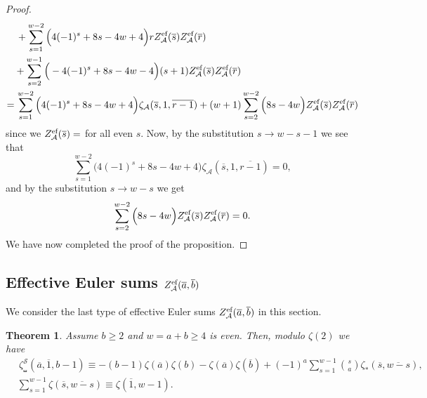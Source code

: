 \documentclass{article}
\newcommand{\sha}{\shuffle}
\newcommand{\Sy}{{\mathcal S}}
\newcommand{\calA}{\mathcal{A}}
\newcommand{\eff}{\text{\rm{ef}}}
\newcommand{\ol}{\overline}
\theoremstyle{plain}
\newtheorem{thm}{Theorem}[section]
\theoremstyle{definition}
\begin{document}
\begin{proof}
\begin{align*}
&\, +   \sum_{s=1}^{w-2} \Big(4(-1)^s+8s-4w+4 \Big) rZ_\calA^\eff(\ol{s})Z_\calA^\eff(\ol{r})\\
& +  \sum_{s=2}^{w-1} \Big(-4(-1)^s+8s-4w-4\Big) (s+1)Z_\calA^\eff(\ol{s})Z_\calA^\eff(\ol{r})\\
=&\,  \sum_{s=1}^{w-2} \Big(4(-1)^s+8s-4w+4 \Big) \zeta_\calA(\ol{s},1,\ol{r-1})
+  (w+1) \sum_{s=2}^{w-2} \Big(8s-4w\Big)  Z_\calA^\eff(\ol{s})Z_\calA^\eff(\ol{r})
\end{align*}
since we $Z_\calA^\eff(\ol{s})=$ for all even $s$. Now, by the substitution $s\to w-s-1$  we see that
\begin{equation*}
 \sum_{s=1}^{w-2} \Big(4(-1)^s+8s-4w+4 \Big) \zeta_\calA(\ol{s},1,\ol{r-1}) = 0,
\end{equation*}
and by the  substitution $s\to w-s$ we get
\begin{equation*}
\sum_{s=2}^{w-2} \Big(8s-4w\Big)Z_\calA^\eff(\ol{s})Z_\calA^\eff(\ol{r})=0.
\end{equation*}
We have now completed the proof of the proposition.
\end{proof}


\subsection{Effective Euler sums $Z_\calA^\eff(\ol{a},\ol{b})$}
We consider the last type of effective Euler sums $Z_\calA^\eff(\ol{a},\ol{b})$ in this section.

\begin{thm}\label{thm:KZeffDBES(-1,-1)}
Assume $b\ge 2$ and $w=a+b\ge 4$ is even. Then, modulo $\zeta(2)$ we have
\begin{align}\label{equ:KZrel1SMES(-1,-1)version}
&\,  \zeta_\sha^\Sy(\ol{a},\ol{1},b-1)
\equiv   -(b-1)\zeta(\ol{a})\zeta(b)-\zeta(\ol{a})\zeta(\ol{b})
 +(-1)^{a}\sum_{s=1}^{w-1}\binom{s}{a}\zeta_*(\ol{s},\ol{w-s}),\\
&\sum_{s=1}^{w-1} \zeta(\ol{s},\ol{w-s})\equiv \zeta(\ol{1},w-1).\label{equ:KZrel2SMES(-1,-1)version}
\end{align}
\end{thm}
\end{document}
